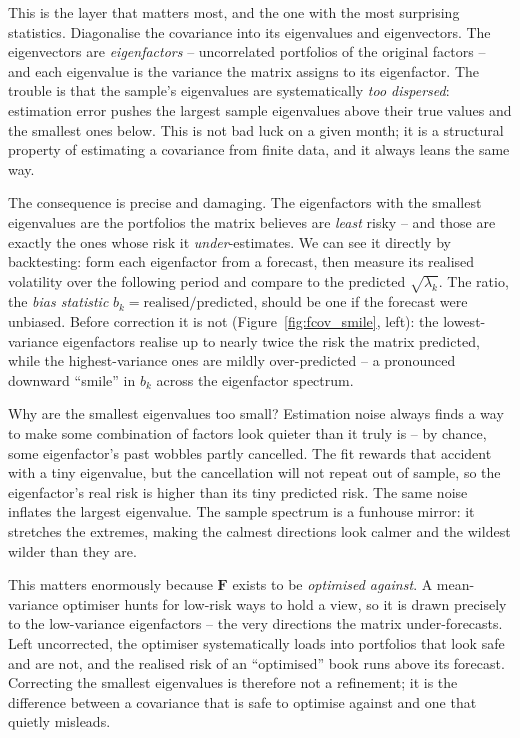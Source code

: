 \documentclass[11pt]{article}
\theoremstyle{definition}
\theoremstyle{plain}
\theoremstyle{remark}
\newcommand{\Fmat}{\mathbf{F}}
\begin{document}
This is the layer that matters most, and the one with the most surprising statistics. Diagonalise the covariance into its eigenvalues and eigenvectors. The eigenvectors are \emph{eigenfactors} -- uncorrelated portfolios of the original factors -- and each eigenvalue is the variance the matrix assigns to its eigenfactor. The trouble is that the sample's eigenvalues are systematically \emph{too dispersed}: estimation error pushes the largest sample eigenvalues above their true values and the smallest ones below. This is not bad luck on a given month; it is a structural property of estimating a covariance from finite data, and it always leans the same way.

The consequence is precise and damaging. The eigenfactors with the smallest eigenvalues are the portfolios the matrix believes are \emph{least} risky -- and those are exactly the ones whose risk it \emph{under}-estimates. We can see it directly by backtesting: form each eigenfactor from a forecast, then measure its realised volatility over the following period and compare to the predicted $\sqrt{\lambda_k}$. The ratio, the \emph{bias statistic} $b_k=\text{realised}/\text{predicted}$, should be one if the forecast were unbiased. Before correction it is not (Figure~\ref{fig:fcov_smile}, left): the lowest-variance eigenfactors realise up to nearly twice the risk the matrix predicted, while the highest-variance ones are mildly over-predicted -- a pronounced downward ``smile'' in $b_k$ across the eigenfactor spectrum.

\begin{intuition}
Why are the smallest eigenvalues too small? Estimation noise always finds a way to make some combination of factors look quieter than it truly is -- by chance, some eigenfactor's past wobbles partly cancelled. The fit rewards that accident with a tiny eigenvalue, but the cancellation will not repeat out of sample, so the eigenfactor's real risk is higher than its tiny predicted risk. The same noise inflates the largest eigenvalue. The sample spectrum is a funhouse mirror: it stretches the extremes, making the calmest directions look calmer and the wildest wilder than they are.
\end{intuition}

This matters enormously because $\Fmat$ exists to be \emph{optimised against}. A mean-variance optimiser hunts for low-risk ways to hold a view, so it is drawn precisely to the low-variance eigenfactors -- the very directions the matrix under-forecasts. Left uncorrected, the optimiser systematically loads into portfolios that look safe and are not, and the realised risk of an ``optimised'' book runs above its forecast. Correcting the smallest eigenvalues is therefore not a refinement; it is the difference between a covariance that is safe to optimise against and one that quietly misleads.
\end{document}
